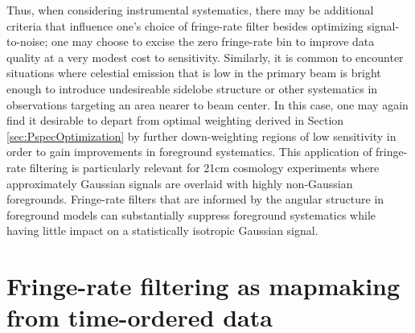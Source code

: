 \documentclass[twocolumn,apj,numberedappendix]{emulateapj}
\begin{document}
Thus, when considering instrumental systematics, there may be additional criteria that influence one's
choice of fringe-rate filter besides optimizing signal-to-noise; one may choose to excise the zero fringe-rate
bin to improve data quality at a very modest cost to sensitivity.  Similarly, it is common to encounter situations
where celestial emission that is low in the primary beam is bright enough to introduce undesireable 
sidelobe structure or other systematics in observations targeting an area nearer to beam center.  In this case,
one may again find it desirable to depart from optimal weighting derived in Section \ref{sec:PspecOptimization}
by further down-weighting regions of low sensitivity in order to gain improvements in foreground systematics.
This application of fringe-rate filtering is particularly relevant for 21cm cosmology experiments where approximately
Gaussian signals are overlaid with highly non-Gaussian foregrounds.  Fringe-rate filters that are informed by 
the angular structure in foreground models can substantially suppress foreground systematics while having little
impact on a statistically isotropic Gaussian signal.








\section{Fringe-rate filtering as mapmaking from time-ordered data}
\label{sec:Mapmaking}
\end{document}

